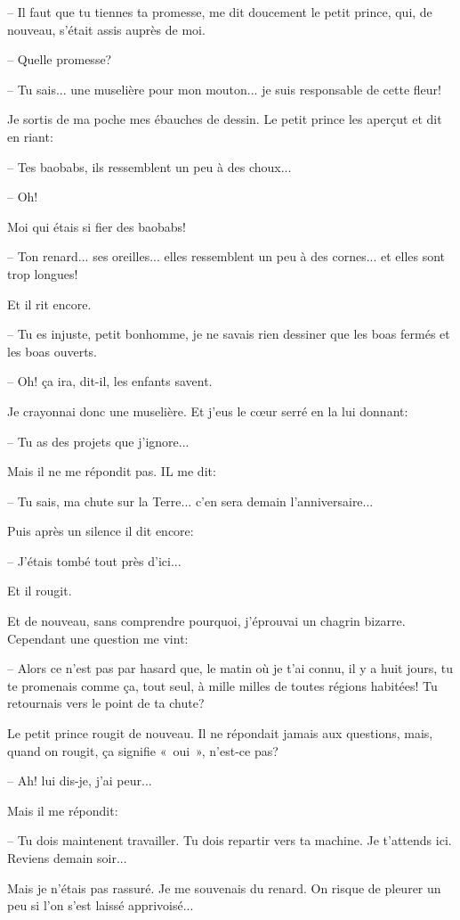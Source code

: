 \documentclass[a4paper]{report}
\begin{document}
-- Il faut que tu tiennes ta promesse, me dit doucement le petit prince, qui, de nouveau, s'était assis auprès de moi.

-- Quelle promesse?

-- Tu sais... une muselière pour mon mouton... je suis responsable de cette fleur!

Je sortis de ma poche mes ébauches de dessin. Le petit prince les aperçut et dit en riant:

-- Tes baobabs, ils ressemblent un peu à des choux...

-- Oh!

Moi qui étais si fier des baobabs!

-- Ton renard... ses oreilles... elles ressemblent un peu à des cornes... et elles sont trop longues!

Et il rit encore.

-- Tu es injuste, petit bonhomme, je ne savais rien dessiner que les boas fermés et les boas ouverts.

-- Oh! ça ira, dit-il, les enfants savent.

Je crayonnai donc une muselière. Et j'eus le cœur serré en la lui donnant:

-- Tu as des projets que j'ignore...

Mais il ne me répondit pas. IL me dit:

-- Tu sais, ma chute sur la Terre... c'en sera demain l'anniversaire...

Puis après un silence il dit encore:

-- J'étais tombé tout près d'ici...

Et il rougit.

Et de nouveau, sans comprendre pourquoi, j'éprouvai un chagrin bizarre. Cependant une question me vint:

-- Alors ce n'est pas par hasard que, le matin où je t'ai connu, il y a huit jours, tu te promenais comme ça, tout seul, à mille milles de toutes régions habitées! Tu retournais vers le point de ta chute?

Le petit prince rougit de nouveau. Il ne répondait jamais aux questions, mais, quand on rougit, ça signifie «~oui~», n'est-ce pas?

-- Ah! lui dis-je, j'ai peur...

Mais il me répondit:

-- Tu dois maintenent travailler. Tu dois repartir vers ta machine. Je t'attends ici. Reviens demain soir...

Mais je n'étais pas rassuré. Je me souvenais du renard. On risque de pleurer un peu si l'on s'est laissé apprivoisé...
\end{document}
